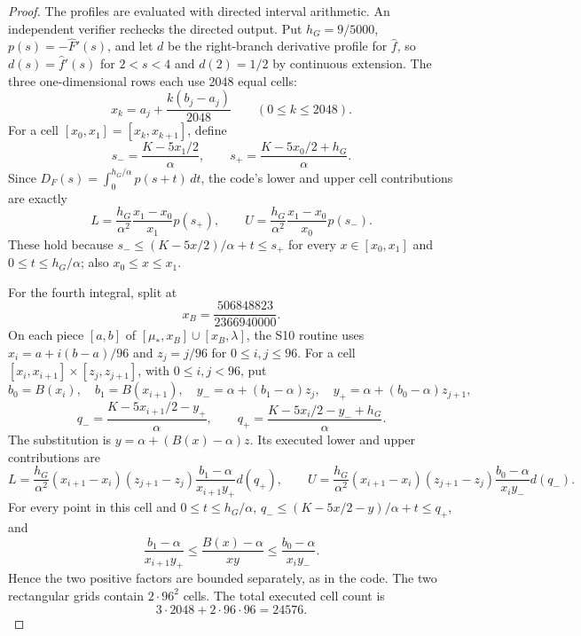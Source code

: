 \begin{proof}
The profiles are evaluated with directed interval arithmetic. An independent
verifier rechecks the directed output. Put
$h_G=9/5000$, $p(s)=-\widehat F'(s)$, and let $d$ be the right-branch
derivative profile for $\widehat f$, so $d(s)=\widehat f'(s)$ for $2<s<4$
and $d(2)=1/2$ by continuous extension.
The three one-dimensional rows each use 2048 equal cells:
\[
 x_k=a_j+\frac{k(b_j-a_j)}{2048}\qquad(0\le k\le2048).
\]
For a cell $[x_0,x_1]=[x_k,x_{k+1}]$, define
\[
 s_-=\frac{K-5x_1/2}{\alpha},\qquad
 s_+=\frac{K-5x_0/2+h_G}{\alpha}.
\]
Since $D_F(s)=\int_0^{h_G/\alpha}p(s+t)\,dt$, the code's lower and upper
cell contributions are exactly
\begin{equation}\label{eq:app-h6-profile-negative-cells}
 L=\frac{h_G}{\alpha^2}\frac{x_1-x_0}{x_1}p(s_+),\qquad
 U=\frac{h_G}{\alpha^2}\frac{x_1-x_0}{x_0}p(s_-).
\end{equation}
These hold because $s_-\le (K-5x/2)/\alpha+t\le s_+$ for every
$x\in[x_0,x_1]$ and $0\le t\le h_G/\alpha$; also $x_0\le x\le x_1$.

For the fourth integral, split at
\[
 x_B=\frac{506848823}{2366940000}.
\]
On each piece $[a,b]$ of $[\mu_*,x_B]\cup[x_B,\lambda]$, the S10 routine uses
$x_i=a+i(b-a)/96$ and $z_j=j/96$ for $0\le i,j\le96$.
For a cell $[x_i,x_{i+1}]\times[z_j,z_{j+1}]$, with $0\le i,j<96$, put
\[
 b_0=B(x_i),\quad b_1=B(x_{i+1}),\quad
 y_-=\alpha+(b_1-\alpha)z_j,\quad
 y_+=\alpha+(b_0-\alpha)z_{j+1},
\]
\[
 q_-=\frac{K-5x_{i+1}/2-y_+}{\alpha},\qquad
 q_+=\frac{K-5x_i/2-y_-+h_G}{\alpha}.
\]
The substitution is $y=\alpha+(B(x)-\alpha)z$. Its executed lower and
upper contributions are
\begin{equation}\label{eq:app-h6-profile-positive-cells}
 L=\frac{h_G}{\alpha^2}(x_{i+1}-x_i)(z_{j+1}-z_j)
       \frac{b_1-\alpha}{x_{i+1}y_+}d(q_+),\qquad
 U=\frac{h_G}{\alpha^2}(x_{i+1}-x_i)(z_{j+1}-z_j)
       \frac{b_0-\alpha}{x_iy_-}d(q_-).
\end{equation}
For every point in this cell and $0\le t\le h_G/\alpha$,
$q_-\le (K-5x/2-y)/\alpha+t\le q_+$, and
\[
 \frac{b_1-\alpha}{x_{i+1}y_+}
 \le\frac{B(x)-\alpha}{xy}
 \le\frac{b_0-\alpha}{x_iy_-}.
\]
Hence the two positive factors are bounded separately, as in the code.
The two rectangular grids contain $2\cdot96^2$ cells. The total
executed cell count is
\[
 3\cdot2048+2\cdot96\cdot96=24576.
\]


\end{proof}
